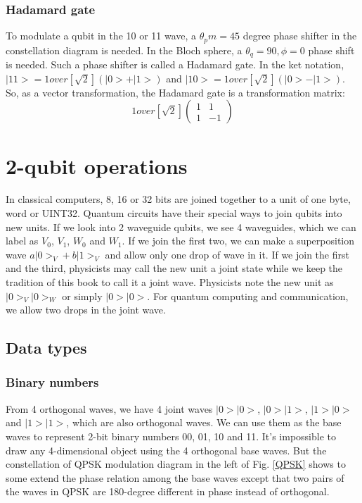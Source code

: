 \documentclass{book}
\begin{document}
\subsection{Hadamard gate}
To modulate a qubit in the 10 or 11 wave, a $\theta_pm = 45$ degree phase shifter in the constellation diagram is needed. In the Bloch sphere, a $\theta_q =90, \phi=0$ phase shift is needed. Such a phase shifter is called a Hadamard gate. In the ket notation, $|11> = 1 over [\sqrt 2] (|0> + |1>)$ and $|10> = 1 over [\sqrt 2] (|0> - |1>)$. So, as a vector transformation, the Hadamard gate is a transformation matrix:
\begin{equation}
    1 over [\sqrt 2]
    \begin{pmatrix}
1 & 1 \\
1 & -1
\end{pmatrix}
\end{equation}

\chapter{2-qubit operations}
In classical computers, 8, 16 or 32 bits are joined together to a unit of one byte, word or UINT32. Quantum circuits have their special ways to join qubits into new units. If we look into 2 waveguide qubits, we see 4 waveguides, which we can label as $V_0$, $V_1$, $W_0$ and $W_1$. If we join the first two, we can make a superposition wave $a|0>_V+b|1>_V$ and allow only one drop of wave in it. If we join the first and the third, physicists may call the new unit a joint state while we keep the tradition of this book to call it a joint wave. Physicists note the new unit as $|0>_V |0>_W$ or simply $|0>|0>$. For quantum computing and communication, we allow two drops in the joint wave.

\section{Data types}
\subsection{Binary numbers}
From 4 orthogonal waves, we have 4 joint waves $|0>|0>$, $|0>|1>$, $|1>|0>$ and $|1>|1>$, which are also orthogonal waves. We can use them as the base waves to represent 2-bit binary numbers 00, 01, 10 and 11. It's impossible to draw any 4-dimensional object using the 4 orthogonal base waves. But the constellation of QPSK modulation diagram in the left of Fig. \ref{QPSK} shows to some extend the phase relation among the base waves except that two pairs of the waves in QPSK are 180-degree different in phase instead of orthogonal.
\end{document}
